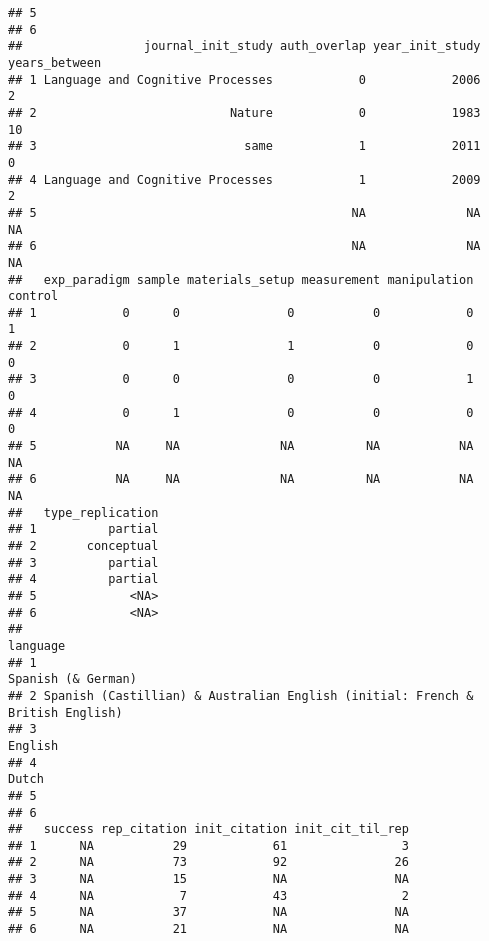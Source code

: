 \documentclass[cm]{glossa}
\begin{document}
\begin{verbatim}
## 5                                                                                                                                                                                                                            
## 6                                                                                                                                                                                                                            
##                 journal_init_study auth_overlap year_init_study years_between
## 1 Language and Cognitive Processes            0            2006             2
## 2                           Nature            0            1983            10
## 3                             same            1            2011             0
## 4 Language and Cognitive Processes            1            2009             2
## 5                                            NA              NA            NA
## 6                                            NA              NA            NA
##   exp_paradigm sample materials_setup measurement manipulation control
## 1            0      0               0           0            0       1
## 2            0      1               1           0            0       0
## 3            0      0               0           0            1       0
## 4            0      1               0           0            0       0
## 5           NA     NA              NA          NA           NA      NA
## 6           NA     NA              NA          NA           NA      NA
##   type_replication
## 1          partial
## 2       conceptual
## 3          partial
## 4          partial
## 5             <NA>
## 6             <NA>
##                                                                        language
## 1                                                            Spanish (& German)
## 2 Spanish (Castillian) & Australian English (initial: French & British English)
## 3                                                                       English
## 4                                                                         Dutch
## 5                                                                              
## 6                                                                              
##   success rep_citation init_citation init_cit_til_rep
## 1      NA           29            61                3
## 2      NA           73            92               26
## 3      NA           15            NA               NA
## 4      NA            7            43                2
## 5      NA           37            NA               NA
## 6      NA           21            NA               NA
\end{verbatim}
\end{document}
